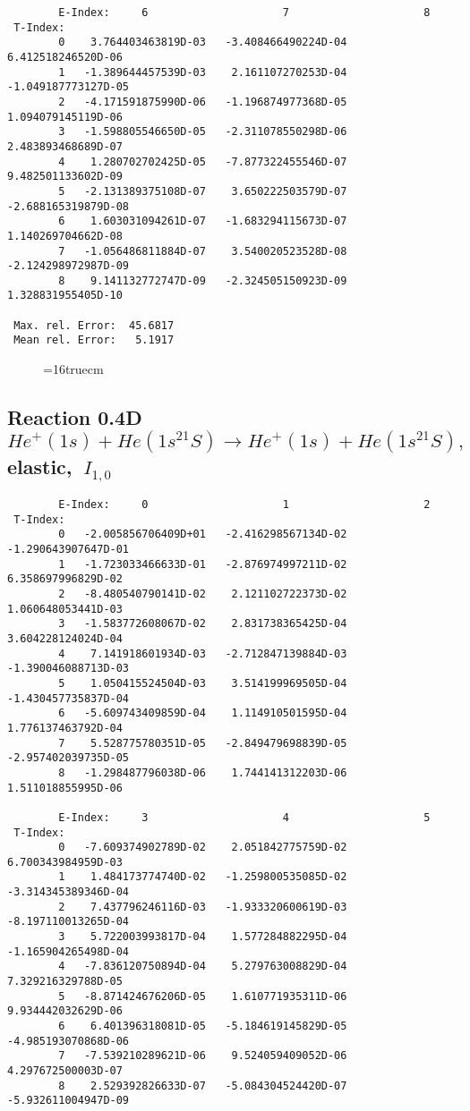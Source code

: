 \documentclass[12pt,dvipdfmx]{article}
\begin{document}
{\begin{small}
\begin{verbatim}
        E-Index:     6                     7                     8
 T-Index:
        0    3.764403463819D-03   -3.408466490224D-04    6.412518246520D-06
        1   -1.389644457539D-03    2.161107270253D-04   -1.049187773127D-05
        2   -4.171591875990D-06   -1.196874977368D-05    1.094079145119D-06
        3   -1.598805546650D-05   -2.311078550298D-06    2.483893468689D-07
        4    1.280702702425D-05   -7.877322455546D-07    9.482501133602D-09
        5   -2.131389375108D-07    3.650222503579D-07   -2.688165319879D-08
        6    1.603031094261D-07   -1.683294115673D-07    1.140269704662D-08
        7   -1.056486811884D-07    3.540020523528D-08   -2.124298972987D-09
        8    9.141132772747D-09   -2.324505150923D-09    1.328831955405D-10

 Max. rel. Error:  45.6817
 Mean rel. Error:   5.1917
\end{verbatim}\end{small}

\begin{figure} \label{0.4T}
\epsfxsize=16truecm
\end{figure}
\newpage

\subsection{
Reaction 0.4D  $He^+(1s) + He(1s^21S) \rightarrow He^+(1s) + He(1s^21S) ,\ $
 elastic, $\  I_{1,0}$
}

\begin{small}\begin{verbatim}
        E-Index:     0                     1                     2
 T-Index:
        0   -2.005856706409D+01   -2.416298567134D-02   -1.290643907647D-01
        1   -1.723033466633D-01   -2.876974997211D-02    6.358697996829D-02
        2   -8.480540790141D-02    2.121102722373D-02    1.060648053441D-03
        3   -1.583772608067D-02    2.831738365425D-04    3.604228124024D-04
        4    7.141918601934D-03   -2.712847139884D-03   -1.390046088713D-03
        5    1.050415524504D-03    3.514199969505D-04   -1.430457735837D-04
        6   -5.609743409859D-04    1.114910501595D-04    1.776137463792D-04
        7    5.528775780351D-05   -2.849479698839D-05   -2.957402039735D-05
        8   -1.298487796038D-06    1.744141312203D-06    1.511018855995D-06

        E-Index:     3                     4                     5
 T-Index:
        0   -7.609374902789D-02    2.051842775759D-02    6.700343984959D-03
        1    1.484173774740D-02   -1.259800535085D-02   -3.314345389346D-04
        2    7.437796246116D-03   -1.933320600619D-03   -8.197110013265D-04
        3    5.722003993817D-04    1.577284882295D-04   -1.165904265498D-04
        4   -7.836120750894D-04    5.279763008829D-04    7.329216329788D-05
        5   -8.871424676206D-05    1.610771935311D-06    9.934442032629D-06
        6    6.401396318081D-05   -5.184619145829D-05   -4.985193070868D-06
        7   -7.539210289621D-06    9.524059409052D-06    4.297672500003D-07
        8    2.529392826633D-07   -5.084304524420D-07   -5.932611004947D-09


\end{verbatim}
\end{small}}
\end{document}
